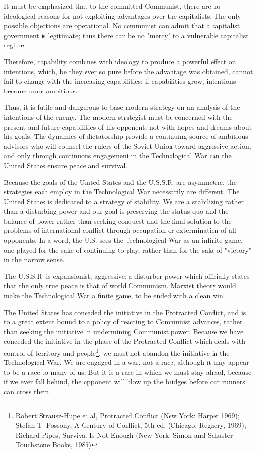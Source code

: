 It must be emphasized that to the committed Communist, there are no ideological reasons for not exploiting advantages over the capitalists. The only possible objections are operational. No communist can admit that a capitalist government is legitimate; thus there can be no "mercy" to a vulnerable capitalist regime.

Therefore, capability combines with ideology to produce a powerful effect on intentions, which, be they ever so pure before the advantage was obtained, cannot fail to change with the increasing capabilities: if capabilities grow, intentions become more ambitious.

Thus, it is futile and dangerous to base modern strategy on an analysis of the intentions of the enemy. The modern strategist must be concerned with the present and future capabilities of his opponent, not with hopes and dreams about his goals. The dynamics of dictatorship provide a continuing source of ambitious advisors who will counsel the rulers of the Soviet Union toward aggressive action, and only through continuous engagement in the Technological War can the United States ensure peace and survival.

Because the goals of the United States and the U.S.S.R. are asymmetric, the strategies each employ in the Technological War necessarily are different. The United States is dedicated to a strategy of stability. We are a stabilizing rather than a disturbing power and our goal is preserving the status quo and the balance of power rather than seeking conquest and the final solution to the problems of international conflict through occupation or extermination of all opponents. In a word, the U.S. sees the Technological War as an infinite game, one played for the sake of continuing to play, rather than for the sake of "victory" in the narrow sense.

The U.S.S.R. is expansionist; aggressive; a disturber power which officially states that the only true peace is that of world Communism. Marxist theory would make the Technological War a finite game, to be ended with a clean win.

The United States has conceded the initiative in the Protracted Conflict, and is to a great extent bound to a policy of reacting to Communist advances, rather than seeking the initiative in undermining Communist power. Because we have conceded the initiative in the phase of the Protracted Conflict which deals with control of territory and people\footnote{Robert Strausz-Hupe et al, Protracted Conflict (New York: Harper 1969); Stefan T. Possony, A Century of Conflict, 5th ed. (Chicago: Regnery, 1969); Richard Pipes, Survival Is Not Enough (New York: Simon and Schuster Touchstone Books, 1986)}, we must not abandon the initiative in the Technological War. We are engaged in a war, not a race, although it may appear to be a race to many of us. But it is a race in which we must stay ahead, because if we ever fall  behind, the opponent will blow up the bridges before our runners can cross them.

